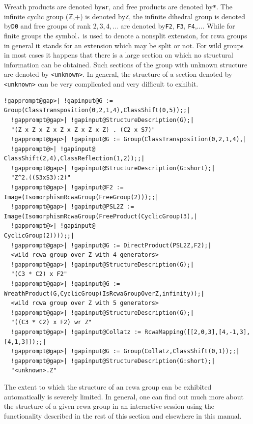 \documentclass[a4paper,11pt]{report}
\begin{document}
{{{ Wreath products are denoted by{\nobreakspace}\texttt{wr}, and free products are denoted by{\nobreakspace}\texttt{*}. The infinite cyclic group ({\ensuremath{\mathbb Z}},+) is denoted
by{\nobreakspace}\texttt{Z}, the infinite dihedral group is denoted by{\nobreakspace}\texttt{D0} and free groups of rank $2,3,4,\dots$ are denoted by{\nobreakspace}\texttt{F2}, \texttt{F3}, \texttt{F4},{\nobreakspace}$\dots$. While for finite groups the symbol{\nobreakspace}\texttt{.} is used to denote a non\texttt{}split extension, for rcwa groups in
general it stands for an extension which may be split or not. For wild groups
in most cases it happens that there is a large section on which no structural
information can be obtained. Such sections of the group with unknown structure
are denoted by \texttt{{\textless}unknown{\textgreater}}. In general, the structure of a section denoted by \texttt{{\textless}unknown{\textgreater}} can be very complicated and very difficult to exhibit. 
\begin{Verbatim}[commandchars=!@|,fontsize=\small,frame=single,label=Example]
  !gapprompt@gap>| !gapinput@G := Group(ClassTransposition(0,2,1,4),ClassShift(0,5));;|
  !gapprompt@gap>| !gapinput@StructureDescription(G);|
  "(Z x Z x Z x Z x Z x Z x Z) . (C2 x S7)"
  !gapprompt@gap>| !gapinput@G := Group(ClassTransposition(0,2,1,4),|
  !gapprompt@>| !gapinput@              ClassShift(2,4),ClassReflection(1,2));;|
  !gapprompt@gap>| !gapinput@StructureDescription(G:short);|
  "Z^2.((S3xS3):2)"
  !gapprompt@gap>| !gapinput@F2 := Image(IsomorphismRcwaGroup(FreeGroup(2)));;|
  !gapprompt@gap>| !gapinput@PSL2Z := Image(IsomorphismRcwaGroup(FreeProduct(CyclicGroup(3),|
  !gapprompt@>| !gapinput@                                                   CyclicGroup(2))));;|
  !gapprompt@gap>| !gapinput@G := DirectProduct(PSL2Z,F2);|
  <wild rcwa group over Z with 4 generators>
  !gapprompt@gap>| !gapinput@StructureDescription(G);|
  "(C3 * C2) x F2"
  !gapprompt@gap>| !gapinput@G := WreathProduct(G,CyclicGroup(IsRcwaGroupOverZ,infinity));|
  <wild rcwa group over Z with 5 generators>
  !gapprompt@gap>| !gapinput@StructureDescription(G);|
  "((C3 * C2) x F2) wr Z"
  !gapprompt@gap>| !gapinput@Collatz := RcwaMapping([[2,0,3],[4,-1,3],[4,1,3]]);;|
  !gapprompt@gap>| !gapinput@G := Group(Collatz,ClassShift(0,1));;|
  !gapprompt@gap>| !gapinput@StructureDescription(G:short);|
  "<unknown>.Z"
\end{Verbatim}
 }

 The extent to which the structure of an rcwa group can be exhibited
automatically is severely limited. In general, one can find out much more
about the structure of a given rcwa group in an interactive session using the
functionality described in the rest of this section and elsewhere in this
manual. 

}}
\end{document}
